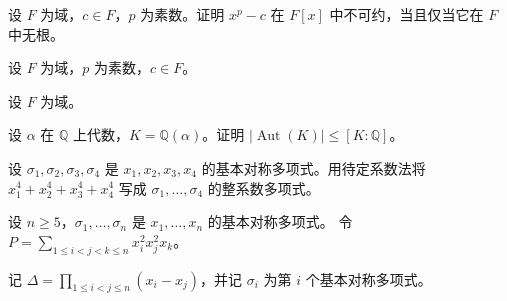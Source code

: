 \noindent\begin{minipage}{\textwidth}
设 $F$ 为域，$c\in F$，$p$ 为素数。证明 $x^p-c$ 在 $F[x]$ 中不可约，当且仅当它在 $F$ 中无根。
\end{minipage}\par\vfill
\noindent\begin{minipage}{\textwidth}
设 $F$ 为域，$p$ 为素数，$c\in F$。
\end{minipage}\par\vfill
\newpage
\noindent\begin{minipage}{\textwidth}
设 $F$ 为域。
\end{minipage}\par\vfill
\noindent\begin{minipage}{\textwidth}
设 $\alpha$ 在 $\mathbb{Q}$ 上代数，$K=\mathbb{Q}(\alpha)$。证明 $\lvert\operatorname{Aut}(K)\rvert\le[K:\mathbb{Q}]$。
\end{minipage}\par\vfill
\noindent\begin{minipage}{\textwidth}
设 $\sigma_1,\sigma_2,\sigma_3,\sigma_4$ 是 $x_1,x_2,x_3,x_4$ 的基本对称多项式。用待定系数法将 $x_1^4+x_2^4+x_3^4+x_4^4$ 写成 $\sigma_1,\ldots,\sigma_4$ 的整系数多项式。
\end{minipage}\par\vfill
\newpage
\noindent\begin{minipage}{\textwidth}
设 $n\ge5$，$\sigma_1,\ldots,\sigma_n$ 是 $x_1,\ldots,x_n$ 的基本对称多项式。
令 $P=\sum_{1\le i<j<k\le n}x_i^2x_j^2x_k$。
\end{minipage}\par\vfill
\noindent\begin{minipage}{\textwidth}
记 $\Delta=\displaystyle\prod_{1\le i<j\le n}(x_i-x_j)$，并记 $\sigma_i$ 为第 $i$ 个基本对称多项式。
\end{minipage}\par\vfill

